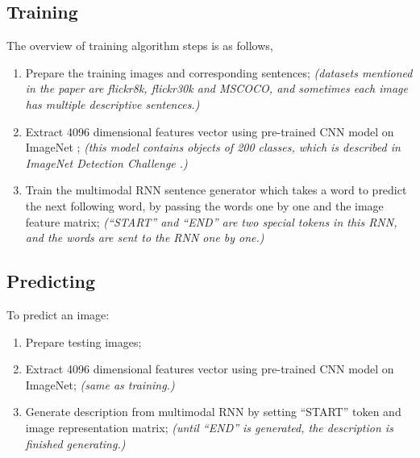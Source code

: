 \documentclass[10pt,twocolumn,letterpaper]{article}
\begin{document}
\subsection{Training}
The overview of training algorithm steps is as follows,
\begin{enumerate}
    \item Prepare the training images and corresponding sentences;
          \textit{(datasets mentioned in the paper are flickr8k, flickr30k and MSCOCO,
          and sometimes each image has multiple descriptive sentences.)}
    \item Extract 4096 dimensional features vector using pre-trained CNN model on ImageNet \cite{imagenet};
          \textit{(this model contains objects of 200 classes, which is described in ImageNet Detection Challenge \cite{inch}.)}
    \item Train the multimodal RNN sentence generator which takes a word to predict the next following word, by passing the words one by one and the image feature matrix;
          \textit{(``START'' and ``END'' are two special tokens in this RNN, and the words are sent to the RNN one by one.)}
\end{enumerate}

\subsection{Predicting}
To predict an image:
\begin{enumerate}
    \item Prepare testing images;
    \item Extract 4096 dimensional features vector using pre-trained CNN model on ImageNet;
          \textit{(same as training.)}
    \item Generate description from multimodal RNN by setting ``START'' token and image representation matrix;
          \textit{(until ``END'' is generated, the description is finished generating.)}
\end{enumerate}
\end{document}

